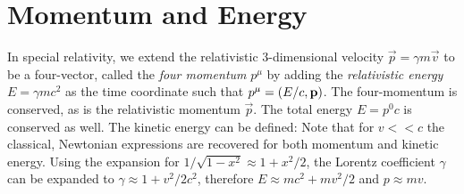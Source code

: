 \section{Momentum and Energy}
In special relativity, we extend the relativistic 3-dimensional velocity $\vec{p}=\gamma m \vec{v}$ to be a four-vector, called the \textit{four momentum} $p^\mu$ by adding the \textit{relativistic energy} $E=\gamma mc^2$ as the time coordinate such that $p^\mu=\left(E/c, \boldsymbol{\mathbf{p}}\right)$. The four-momentum is conserved, as is the relativistic momentum $\vec{p}$. The total energy $E=p^0 c$ is conserved as well. The kinetic energy can be defined:
Note that for $v << c$ the classical, Newtonian expressions are recovered for both momentum and kinetic energy. Using the expansion for $1/\sqrt{1-x^2}\approx 1 + x^2/2$, the Lorentz coefficient $\gamma$ can be expanded to $\gamma \approx 1 + v^2/2c^2$, therefore $E\approx mc^2 + mv^2/2$ and $p\approx mv$.


